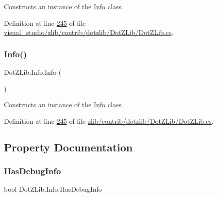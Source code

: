 Constructs an instance of the {\ttfamily \hyperlink{class_dot_z_lib_1_1_info}{Info}} class. 



Definition at line \hyperlink{visual__studio_2zlib_2contrib_2dotzlib_2_dot_z_lib_2_dot_z_lib_8cs_source_l00245}{245} of file \hyperlink{visual__studio_2zlib_2contrib_2dotzlib_2_dot_z_lib_2_dot_z_lib_8cs_source}{visual\+\_\+studio/zlib/contrib/dotzlib/\+Dot\+Z\+Lib/\+Dot\+Z\+Lib.\+cs}.

\mbox{\label{class_dot_z_lib_1_1_info_a48b690fe56ca7cc8e8a40a740476696b}} 
\subsubsection{\texorpdfstring{Info()}{Info()}\hspace{0.1cm}{\footnotesize\ttfamily [2/2]}}
{\footnotesize\ttfamily Dot\+Z\+Lib.\+Info.\+Info (\begin{DoxyParamCaption}{ }\end{DoxyParamCaption})\hspace{0.3cm}{\ttfamily [inline]}}



Constructs an instance of the {\ttfamily \hyperlink{class_dot_z_lib_1_1_info}{Info}} class. 



Definition at line \hyperlink{zlib_2contrib_2dotzlib_2_dot_z_lib_2_dot_z_lib_8cs_source_l00245}{245} of file \hyperlink{zlib_2contrib_2dotzlib_2_dot_z_lib_2_dot_z_lib_8cs_source}{zlib/contrib/dotzlib/\+Dot\+Z\+Lib/\+Dot\+Z\+Lib.\+cs}.



\subsection{Property Documentation}
\mbox{\label{class_dot_z_lib_1_1_info_ad37fbab0ca0a3b8219d9c59ad7964255}} 
\subsubsection{\texorpdfstring{Has\+Debug\+Info}{HasDebugInfo}}
{\footnotesize\ttfamily bool Dot\+Z\+Lib.\+Info.\+Has\+Debug\+Info\hspace{0.3cm}{\ttfamily [get]}}



